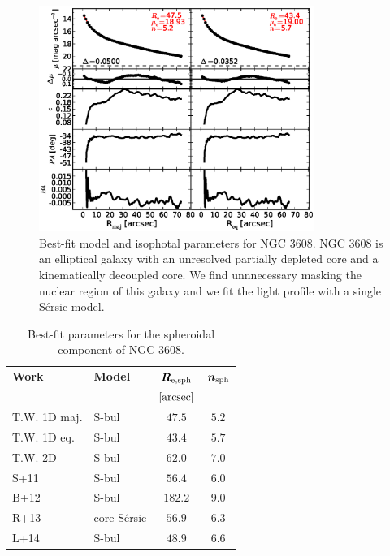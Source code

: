 \documentclass[preprint2]{emulateapj}
\newcommand{\fitfigurewidth}{0.8\textwidth}
\begin{document}
  \begin{figure}[h]
  \begin{center}
  \includegraphics[width=\fitfigurewidth]{images/n3608_1Dfit.eps}
  \caption{Best-fit model and isophotal parameters for NGC 3608.
  NGC 3608 is an elliptical galaxy with an unresolved partially depleted core \citep{rusli2013} 
  and a kinematically decoupled core. 
  We find unnnecessary masking the nuclear region of this galaxy and we fit the light profile with a single S\'ersic model.
  }
  \end{center}
  \end{figure}
  
  \begin{table}[h]
  \small
  \caption{Best-fit parameters for the spheroidal component of NGC 3608.}
  \begin{center}
  \begin{tabular}{llcc}
  \hline
  {\bf Work} & {\bf Model}   & $\bm R_{\rm e,sph}$    & $\bm n_{\rm sph}$ \\
    &  &  $[\rm arcsec]$ & \\
  \hline
  T.W. 1D maj. & S-bul & $47.5$  &  $5.2$ \\
  T.W. 1D eq.  & S-bul & $43.4$  &  $5.7$ \\
  T.W. 2D      & S-bul & $62.0$  &  $7.0$ \\
  \hline
  S+11         & S-bul            & $56.4$  &  $6.0$ \\
  B+12         & S-bul            & $182.2$  &  $9.0$ \\
  R+13         & core-S\'ersic    & $56.9$  &  $6.3$ \\
  L+14         & S-bul            & $48.9$  &  $6.6$ \\
  \hline
  \end{tabular}
  \end{center}
  \label{tab:n3608}
  \end{table}
\end{document}
